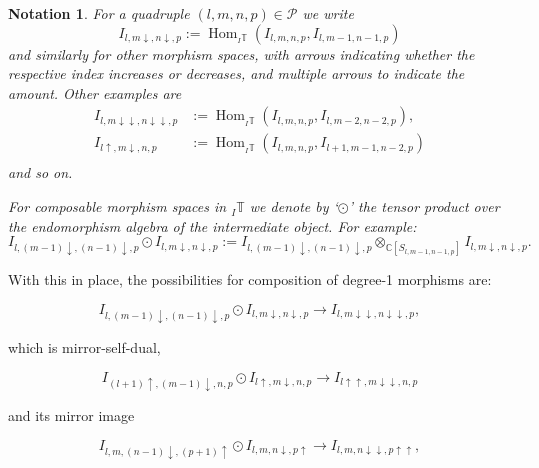 \documentclass[11pt]{article}
\theoremstyle{plain}
\theoremstyle{nonumberplain}
\theoremstyle{plain}
\newtheorem{notation}[lemma]{Notation}
\numberwithin{equation}{section}
\theoremstyle{nonumberplain}
\newcommand\bC{{\mathbb C}}
\newcommand\bT{{\mathbb T}}
\newcommand\cC{{\mathcal C}}
\newcommand\cP{{\mathcal P}}
\newcommand\1{{\bf 1}}
\DeclareMathOperator{\Hom}{\mathrm{Hom}}
\begin{document}
\begin{notation}\label{not:iud}
  For a quadruple $(l,m,n,p)\in \cP$ we write
  \begin{equation*}
    I_{l,m\downarrow,n\downarrow,p}:=\Hom_{{}_I\bT}(I_{l,m,n,p},I_{l,m-1,n-1,p})
  \end{equation*}
  and similarly for other morphism spaces, with arrows indicating whether the respective index increases or decreases, and multiple arrows to indicate the amount. Other examples are
  \begin{align*}
    I_{l,m\downarrow\downarrow,n\downarrow\downarrow,p}&:=\Hom_{{}_I\bT}(I_{l,m,n,p},I_{l,m-2,n-2,p}){,}\\
    I_{l\uparrow,m\downarrow,n,p}&:=\Hom_{{}_I\bT}(I_{l,m,n,p},I_{l+1,m-1,n-2,p})\\
  \end{align*}
  and so on.

  For composable morphism spaces in ${}_I\bT$ we denote by `$\odot$' the tensor product over the endomorphism algebra of the intermediate object. For example:
  \begin{equation*}
    I_{l,(m-1)\downarrow,(n-1)\downarrow,p}\odot I_{l,m\downarrow,n\downarrow,p}
    :=
    I_{l,(m-1)\downarrow,(n-1)\downarrow,p}\otimes_{\bC [S_{l,m-1,n-1,p}]} I_{l,m\downarrow,n\downarrow,p}{.}
  \end{equation*}
\end{notation}



With this in place, the possibilities for composition of degree-1 morphisms are:

\begin{equation}\label{eq:22}
  I_{l,(m-1)\downarrow,(n-1)\downarrow,p}\odot I_{l,m\downarrow,n\downarrow,p}
  \to
  I_{l,m\downarrow\downarrow,n\downarrow\downarrow,p},
\end{equation}

which is mirror-self-dual,

\begin{equation}\label{eq:23}
  I_{(l+1)\uparrow,(m-1)\downarrow,n,p}\odot I_{l\uparrow,m\downarrow,n,p}
  \to
  I_{l\uparrow\uparrow,m\downarrow\downarrow,n,p}
\end{equation}

and its mirror image

\begin{equation}\label{eq:24}
  I_{l,m,(n-1)\downarrow,(p+1)\uparrow}\odot I_{l,m,n\downarrow,p\uparrow}
  \to
  I_{l,m,n\downarrow\downarrow,p\uparrow\uparrow},
\end{equation}
\end{document}
